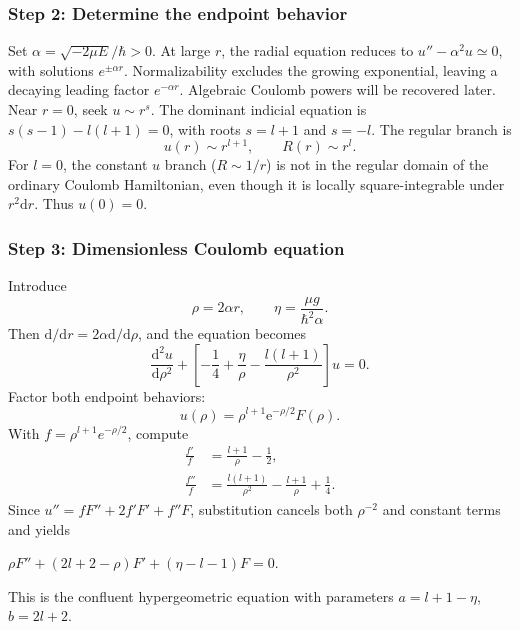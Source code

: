 \documentclass[11pt,a4paper]{article}
\newcommand{\key}[1]{\begin{resultbox}\centering\(\displaystyle #1\)\end{resultbox}}
\newcommand{\dd}{\mathrm{d}}
\newcommand{\ee}{\mathrm{e}}
\begin{document}
\subsubsection*{Step 2: Determine the endpoint behavior}
Set \(\alpha=\sqrt{-2\mu E}/\hbar>0\). At large \(r\), the radial equation reduces to \(u''-\alpha^2u\simeq0\), with solutions \(e^{\pm\alpha r}\). Normalizability excludes the growing exponential, leaving a decaying leading factor \(e^{-\alpha r}\). Algebraic Coulomb powers will be recovered later.
Near \(r=0\), seek \(u\sim r^s\). The dominant indicial equation is \(s(s-1)-l(l+1)=0\), with roots \(s=l+1\) and \(s=-l\). The regular branch is
\begin{equation}\boxed{u(r)\sim r^{l+1},\qquad R(r)\sim r^l.}\end{equation}
For \(l=0\), the constant \(u\) branch (\(R\sim1/r\)) is not in the regular domain of the ordinary Coulomb Hamiltonian, even though it is locally square-integrable under \(r^2\dd r\). Thus \(u(0)=0\).

\subsubsection*{Step 3: Dimensionless Coulomb equation}
Introduce
\begin{equation}\boxed{\rho=2\alpha r,\qquad \eta=\frac{\mu g}{\hbar^2\alpha}.}\end{equation}
Then \(\dd/\dd r=2\alpha\dd/\dd\rho\), and the equation becomes
\begin{equation}\boxed{\frac{\dd^2u}{\dd\rho^2}+\left[-\frac14+\frac\eta\rho-\frac{l(l+1)}{\rho^2}\right]u=0.}\end{equation}
Factor both endpoint behaviors:
\begin{equation}\boxed{u(\rho)=\rho^{l+1}\ee^{-\rho/2}F(\rho).}\end{equation}
With \(f=\rho^{l+1}e^{-\rho/2}\), compute
\begin{align}
\frac{f'}f&=\frac{l+1}{\rho}-\frac12,\\
\frac{f''}f&=\frac{l(l+1)}{\rho^2}-\frac{l+1}{\rho}+\frac14.
\end{align}
Since \(u''=fF''+2f'F'+f''F\), substitution cancels both \(\rho^{-2}\) and constant terms and yields
\key{\boxed{\rho F''+(2l+2-\rho)F'+(\eta-l-1)F=0.}}
This is the confluent hypergeometric equation with parameters \(a=l+1-\eta\), \(b=2l+2\).
\end{document}
